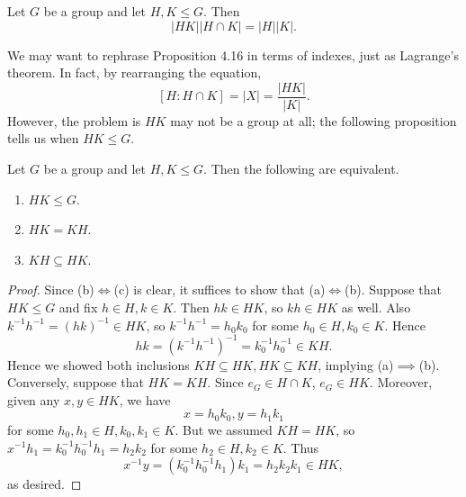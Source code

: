 \documentclass[pmath347]{subfiles}
\begin{document}
    \begin{prop}{}
        Let $G$ be a group and let $H,K\leq G$. Then
        \begin{equation*}
            \left| HK \right| \left| H\cap K \right| = \left| H \right| \left| K \right| .
        \end{equation*}
    \end{prop}

    \np We may want to rephrase Proposition 4.16 in terms of indexes, just as Lagrange's theorem. In fact, by rearranging the equation,
    \begin{equation*}
        \left[ H:H\cap K \right] = \left| X \right| = \frac{\left| HK \right| }{\left| K \right| }.
    \end{equation*}
    However, the problem is $HK$ may not be a group at all; the following proposition tells us when $HK\leq G$.

    \clearpage
    \begin{prop}{}
        Let $G$ be a group and let $H,K\leq G$. Then the following are equivalent.
        \begin{enumerate}
            \item $HK\leq G$.
            \item $HK=KH$.
            \item $KH\subseteq HK$.
        \end{enumerate}
    \end{prop}

    \begin{proof}
        Since (b)$\iff$(c) is clear, it suffices to show that (a)$\iff$(b). Suppose that $HK\leq G$ and fix $h\in H, k\in K$. Then $hk\in HK$, so $kh\in HK$ as well. Also $k^{-1} h^{-1} = \left( hk \right) ^{-1} \in HK$, so $k^{-1} h^{-1} = h_0k_0$ for some $h_0\in H, k_0\in K$. Hence
            \begin{equation*}
                hk = \left( k^{-1} h^{-1}  \right) ^{-1} = k_0^{-1} h_0^{-1} \in KH.
            \end{equation*}
            Hence we showed both inclusions $KH\subseteq HK, HK\subseteq KH$, implying (a)$\implies$(b). Conversely, suppose that $HK=KH$. Since $e_G\in H\cap K$, $e_G\in HK$. Moreover, given any $x,y\in HK$, we have
            \begin{equation*}
                x = h_0k_0, y = h_1k_1
            \end{equation*}
            for some $h_0,h_1\in H, k_0,k_1\in K$. But we assumed $KH=HK$, so $x^{-1} h_1 = k_0^{-1} h_0^{-1} h_1 = h_2k_2$ for some $h_2\in H, k_2\in K$. Thus
            \begin{equation*}
                x^{-1} y = \left( k_0^{-1} h_0^{-1} h_1 \right) k_1 = h_2k_2k_1\in HK,
            \end{equation*}
            as desired.
    \end{proof}
\end{document}

